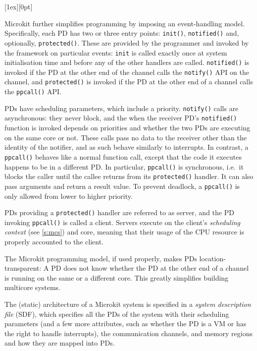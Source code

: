 \documentclass[english,a4paper,12pt]{report}
\newcommand{\code}[1]{\texttt{#1}}
\newlength{\chillilng}\setlength{\chillilng}{8mm}
\newlength{\chillimarg}\setlength{\chillimarg}{10mm}
\newcommand{\chilli}{\texttt{[image: chilli]}}
\newcommand{\chilliItem}{\raisebox{-5mm}[1ex][0pt]{%
      \makebox[\chillilng][r]{\chilli}}}
\newenvironment{Chilli}{
    \begin{list}{}{
      \setlength{\labelwidth}{\chillilng}
      \setlength{\leftmargin}{\chillimarg}}
    \item[\chilliItem]
    }
  {\end{list}}
\begin{document}
  \begin{Chilli}
    Microkit further simplifies programming by imposing an
    event-handling model. Specifically, each PD has two or three entry
    points: \code{init()}, \code{notified()} and, optionally,
    \code{protected()}. These are provided by the programmer and invoked
    by the framework on particular events: \code{init} is called exactly
    once at system initialisation time and before any of the other
    handlers are called. \code{notified()} is invoked if the PD at the
    other end of the channel calls the \code{notify()} API on the
    channel, and \code{protected()} is invoked if the PD at the other
    end of a channel calls the \code{ppcall()} API.

    PDs have scheduling parameters, which include a priority.
    \code{notify()} calls are asynchronous: they never block, and the
    when the receiver PD's \code{notified()} function is invoked depends
    on priorities and whether the two PDs are executing on the same core
    or not. These calls pass no data to the receiver other than the
    identity of the notifier, and as such behave similarly to
    interrupts. In contrast, a \code{ppcall()} behaves like a normal
    function call, except that the code it executes happens to be in a
    different PD. In particular, \code{ppcall()} is synchronous, i.e.\ it blocks
    the caller until the callee returns from its \code{protected()}
    handler.  It can also pass arguments and return a
    result value. To prevent deadlock,  a \code{ppcall()} is only
    allowed from lower to higher priority.

    PDs providing a \code{protected()} handler are referred to as
    server, and the PD invoking \code{ppcall()} is called a
    client. Servers execute on the client's \emph{scheduling context}
    (see \autoref{s:mcs}) and core, meaning that their usage of the CPU
    resource is properly accounted to the client.

    The Microkit programming model, if used properly, makes PDs
    location-transparent: A PD does not know whether the PD at the
    other end of a channel is running on the same or a different
    core. This greatly simplifies building multicore systems.
  \end{Chilli}

  The (static) architecture of a Microkit system is specified in a
  \emph{system description file} (SDF), which specifies all the PDs of
  the system with their scheduling parameters (and a few more
  attributes, such as whether the PD is a VM or has the right to
  handle interrupts), the communication channels, and memory regions
  and how they are mapped into PDs.
\end{document}
